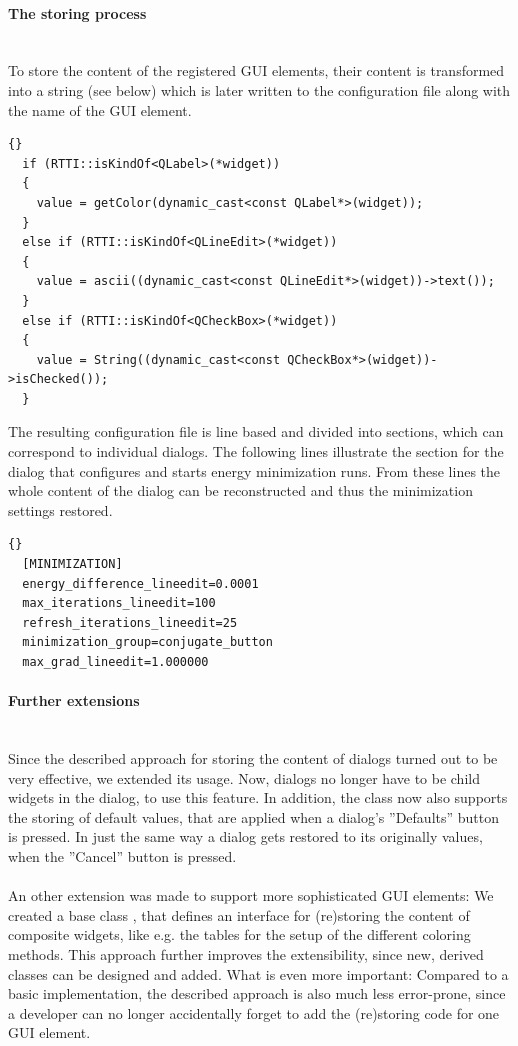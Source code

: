 \paragraph{The storing process}
\hspace*{\fill}\\
To store the content of the registered GUI elements, their content
is transformed into a string (see below) which is later written to the configuration
file along with the name of the GUI element.

\begin{lstlisting}{}
  if (RTTI::isKindOf<QLabel>(*widget))
  {
  	value = getColor(dynamic_cast<const QLabel*>(widget));
  }
  else if (RTTI::isKindOf<QLineEdit>(*widget))
  {
    value = ascii((dynamic_cast<const QLineEdit*>(widget))->text());
  }
  else if (RTTI::isKindOf<QCheckBox>(*widget))
  {
    value = String((dynamic_cast<const QCheckBox*>(widget))->isChecked());
  }
\end{lstlisting}

The resulting configuration file is line based and divided into sections,
which can correspond to individual dialogs. The following lines illustrate
the section for the dialog that configures and starts energy minimization runs.
From these lines the whole content of the dialog can be reconstructed and thus the 
minimization settings restored.
\begin{lstlisting}{}
  [MINIMIZATION]
  energy_difference_lineedit=0.0001
  max_iterations_lineedit=100
  refresh_iterations_lineedit=25
  minimization_group=conjugate_button
  max_grad_lineedit=1.000000
\end{lstlisting}

\paragraph{Further extensions}
\hspace*{\fill}\\
Since the described approach for storing the content of dialogs turned out to be very 
effective, we extended its usage. 
Now, dialogs no longer have to be child widgets in the 
 dialog, to use this feature.
In addition, the  class now also supports the storing of default 
values, that are applied when a dialog's ''Defaults'' button is pressed.
In just the same way a dialog gets restored to its originally values, when the ''Cancel'' 
button is pressed.\\
\\
An other extension was made to support more sophisticated
GUI elements: We created a base class , that defines an 
interface for (re)storing the content of composite widgets, like e.g. the tables for the 
setup of the different coloring methods. This approach further improves the 
extensibility, since new, derived  classes can be designed
and added.
What is even more important: Compared to a basic implementation, the described approach is also much less error-prone, since a developer 
can no longer accidentally forget to add the (re)storing code for one GUI element.

